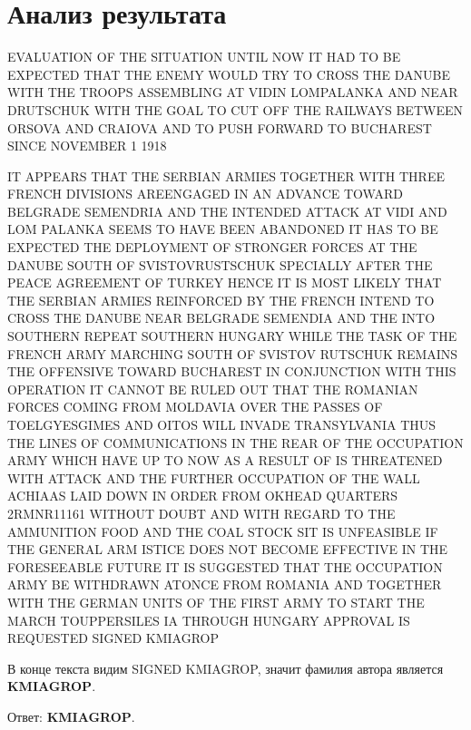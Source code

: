 \documentclass{article}
\begin{document}
\section{Анализ результата}

\begin{mdframed}
EVALUATION OF THE SITUATION UNTIL NOW IT HAD TO BE EXPECTED THAT THE ENEMY WOULD TRY TO CROSS THE DANUBE WITH THE TROOPS ASSEMBLING AT VIDIN LOMPALANKA AND NEAR DRUTSCHUK WITH THE GOAL TO CUT OFF THE RAILWAYS BETWEEN ORSOVA AND CRAIOVA AND TO PUSH FORWARD TO BUCHAREST SINCE NOVEMBER 1 1918

\noindent IT APPEARS THAT THE SERBIAN ARMIES TOGETHER WITH THREE FRENCH DIVISIONS AREENGAGED IN AN ADVANCE TOWARD BELGRADE SEMENDRIA AND THE INTENDED ATTACK AT VIDI AND LOM PALANKA SEEMS TO HAVE BEEN ABANDONED IT HAS TO BE EXPECTED THE DEPLOYMENT OF STRONGER FORCES AT THE DANUBE SOUTH OF SVISTOVRUSTSCHUK SPECIALLY AFTER THE PEACE AGREEMENT OF TURKEY HENCE IT IS MOST LIKELY THAT THE SERBIAN ARMIES REINFORCED BY THE FRENCH INTEND TO CROSS THE DANUBE NEAR BELGRADE SEMENDIA AND THE INTO SOUTHERN REPEAT SOUTHERN HUNGARY WHILE THE TASK OF THE FRENCH ARMY MARCHING SOUTH OF SVISTOV RUTSCHUK REMAINS THE OFFENSIVE TOWARD BUCHAREST IN CONJUNCTION WITH THIS OPERATION IT CANNOT BE RULED OUT THAT THE ROMANIAN FORCES COMING FROM MOLDAVIA OVER THE PASSES OF TOELGYESGIMES AND OITOS WILL INVADE TRANSYLVANIA THUS THE LINES OF COMMUNICATIONS IN THE REAR OF THE OCCUPATION ARMY WHICH HAVE UP TO NOW AS A RESULT OF IS THREATENED WITH ATTACK AND THE FURTHER OCCUPATION OF THE WALL ACHIAAS LAID DOWN IN ORDER FROM OKHEAD QUARTERS 2RMNR11161 WITHOUT DOUBT AND WITH REGARD TO THE AMMUNITION FOOD AND THE COAL STOCK SIT IS UNFEASIBLE IF THE GENERAL ARM ISTICE DOES NOT BECOME EFFECTIVE IN THE FORESEEABLE FUTURE IT IS SUGGESTED THAT THE OCCUPATION ARMY BE WITHDRAWN ATONCE FROM ROMANIA AND TOGETHER WITH THE GERMAN UNITS OF THE FIRST ARMY TO START THE MARCH TOUPPERSILES IA THROUGH HUNGARY APPROVAL IS REQUESTED SIGNED KMIAGROP
\end{mdframed}

В конце текста видим SIGNED KMIAGROP, значит фамилия автора является \textbf{KMIAGROP}.

Ответ: \textbf{KMIAGROP}.
\end{document}
